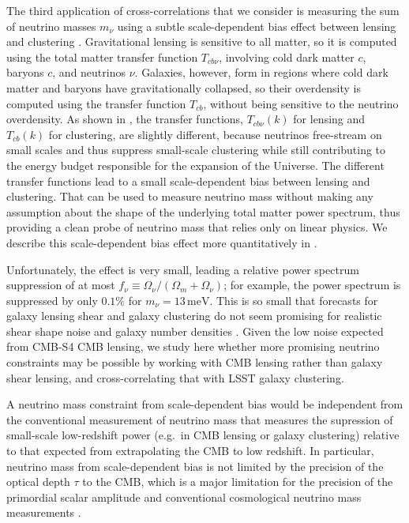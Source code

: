 \documentclass[prd,superscriptaddress,floatfix,notitlepage,nofootinbib,reprint]{revtex4-1} %
\begin{document}
The third application of cross-correlations that we consider is measuring the sum of neutrino masses $m_\nu$ using a subtle scale-dependent bias effect between lensing and clustering \cite{Villaescusa-Navarro1311,Castorina1311,LoVerde1405,LoVerde1602}.
Gravitational lensing is sensitive to all matter, so it is computed using the total matter transfer function $T_{cb\nu}$, involving cold dark matter $c$, baryons $c$, and neutrinos $\nu$. 
Galaxies, however, form in regions where cold dark matter and baryons have gravitationally collapsed, so their overdensity is computed using the transfer function $T_{cb}$, without being sensitive to the neutrino overdensity. 
As shown in , the transfer functions, $T_{cb\nu}(k)$ for lensing and $T_{cb}(k)$ for clustering, are slightly different, because neutrinos free-stream on small scales and thus suppress small-scale clustering while still contributing to the energy budget responsible for the expansion of the Universe.  The different transfer functions lead to a small scale-dependent bias between lensing and clustering.
That can be used to measure neutrino mass without making any assumption about the shape of the underlying total matter power spectrum, thus providing a clean probe of neutrino mass that relies only on linear physics.
We describe this scale-dependent bias effect more quantitatively in .

Unfortunately, the effect is very small, leading a relative power spectrum suppression of at most $f_\nu\equiv\Omega_\nu/(\Omega_m+\Omega_\nu)$; for example, the power spectrum is suppressed by only $0.1\%$ for $m_\nu=13\,\mathrm{meV}$.
This is so small that forecasts for galaxy lensing shear and galaxy clustering do not seem promising for realistic shear shape noise and galaxy number densities \cite{LoVerde1602}.
Given the low noise expected from CMB-S4 CMB lensing, we study here whether more promising neutrino constraints may be possible by working with CMB lensing rather than galaxy shear lensing, and cross-correlating that with LSST galaxy clustering.

A neutrino mass constraint from scale-dependent bias would be independent from the conventional measurement of neutrino mass that measures the supression of small-scale low-redshift power (e.g.~in CMB lensing or galaxy clustering) relative to that expected from extrapolating the CMB to low redshift. 
In particular, neutrino mass from scale-dependent bias is not limited by the precision of the optical depth $\tau$ to the CMB, which is a major limitation for the precision of the primordial scalar amplitude and conventional cosmological neutrino mass measurements \cite{Allison1509,CMBS4SciBook}.
\end{document}
